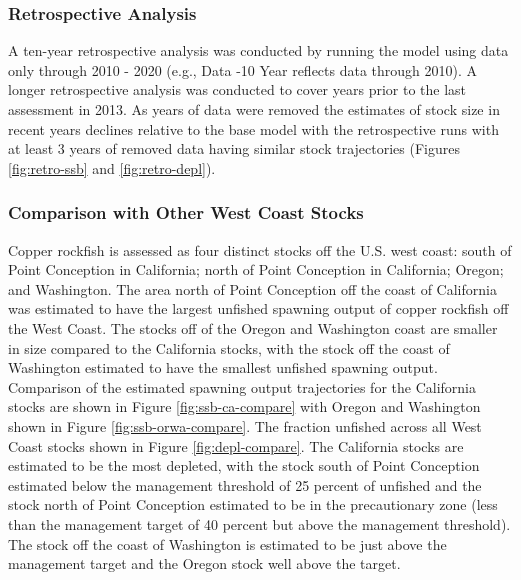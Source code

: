 \documentclass[11pt,
  english,
  a4paper,
]{article}
\begin{document}
\leavevmode\tagmcend\tagstructend\par


\hypertarget{retrospective-analysis}{%
\subsubsection{Retrospective Analysis}\label{retrospective-analysis}}

\leavevmode\tagmcend\tagstructend


A ten-year retrospective analysis was conducted by running the model using data only through 2010 - 2020 (e.g., Data -10 Year reflects data through 2010). A longer retrospective analysis was conducted to cover years prior to the last assessment in 2013. As years of data were removed the estimates of stock size in recent years declines relative to the base model with the retrospective runs with at least 3 years of removed data having similar stock trajectories (Figures \ref{fig:retro-ssb} and \ref{fig:retro-depl}).

\leavevmode\tagmcend\tagstructend\par


\hypertarget{comparison-with-other-west-coast-stocks}{%
\subsubsection{Comparison with Other West Coast Stocks}\label{comparison-with-other-west-coast-stocks}}

\leavevmode\tagmcend\tagstructend


Copper rockfish is assessed as four distinct stocks off the U.S. west coast: south of Point Conception in California; north of Point Conception in California; Oregon; and Washington. The area north of Point Conception off the coast of California was estimated to have the largest unfished spawning output of copper rockfish off the West Coast. The stocks off of the Oregon and Washington coast are smaller in size compared to the California stocks, with the stock off the coast of Washington estimated to have the smallest unfished spawning output. Comparison of the estimated spawning output trajectories for the California stocks are shown in Figure \ref{fig:ssb-ca-compare} with Oregon and Washington shown in Figure \ref{fig:ssb-orwa-compare}. The fraction unfished across all West Coast stocks shown in Figure \ref{fig:depl-compare}. The California stocks are estimated to be the most depleted, with the stock south of Point Conception estimated below the management threshold of 25 percent of unfished and the stock north of Point Conception estimated to be in the precautionary zone (less than the management target of 40 percent but above the management threshold). The stock off the coast of Washington is estimated to be just above the management target and the Oregon stock well above the target.
\end{document}
